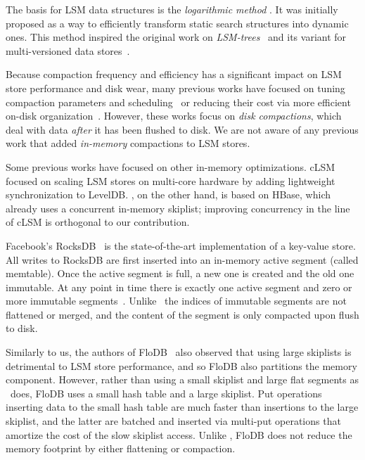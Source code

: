 The basis for LSM data structures is the \emph{logarithmic
method} \cite{Bentley79}.
It was initially
proposed as a way to efficiently transform static search structures into dynamic ones.
This method inspired the original work on
\emph{LSM-trees}~\cite{O'Neil1996} and its variant for multi-versioned
data stores~\cite{Muth1998}.






Because compaction frequency and efficiency has a significant impact on LSM store performance and disk wear, 
many previous works have focused on tuning compaction parameters and scheduling~\cite{hbasetuning,rocksdb,
scylladbcompaction,universalcompaction,Sears:2012} or reducing their cost via more efficient on-disk organization~\cite{wisckey}. 
However, these works focus on \emph{disk compactions},
which deal with data \emph{after} it has been flushed to disk. We are not aware of any previous work that 
added \emph{in-memory} compactions to LSM stores.

Some previous works have focused on other in-memory optimizations. 
cLSM~\cite{clsm} focused on scaling LSM stores on multi-core hardware by adding lightweight synchronization to LevelDB. 
\sys, on the other hand, is based on HBase, which already uses a concurrent in-memory skiplist; improving concurrency
in the line of cLSM is orthogonal to our contribution.  

Facebook's RocksDB~\cite{rocksdb} is the state-of-the-art implementation of a key-value store.
All writes to RocksDB are first inserted into an in-memory active segment (called memtable). Once the active segment is full, a new one is created and the old one immutable. At any point in time there is exactly one active segment and zero or more immutable segments~\cite{rocksdbtuning}. Unlike \sys\ the indices of immutable segments are not flattened or merged, and the content of the segment is only compacted upon flush to disk.

Similarly to us, the authors of FloDB~\cite{flodb} also observed that using large skiplists is detrimental to 
LSM store performance, and so FloDB also partitions the memory component. However, rather than using 
a small skiplist and large flat segments as \sys\ does, FloDB  uses a small hash table and a large skiplist.
Put operations inserting data to the small hash table are much faster than insertions to the large skiplist, 
and the latter are batched and inserted via multi-put operations that amortize the cost of the slow skiplist access.
Unlike \sys, FloDB does not reduce the memory footprint by either flattening or compaction. 

